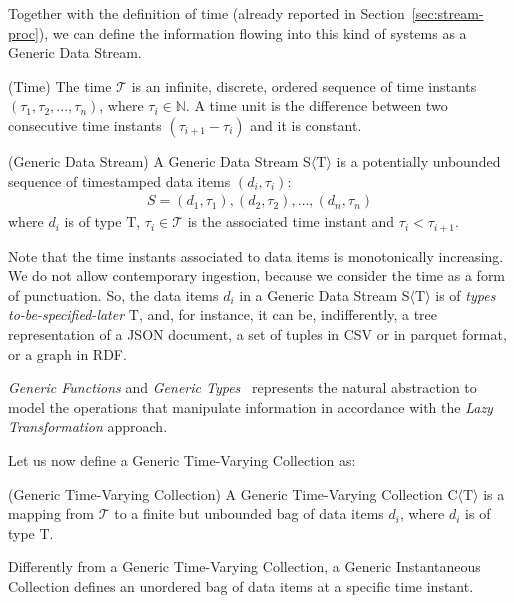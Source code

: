 Together with the definition of time (already reported in Section~\ref{sec:stream-proc}), we can define the information flowing into this kind of systems as a Generic Data Stream.

\begin{Definition}
(Time) The time $\mathcal{T}$ is an infinite, discrete, ordered sequence of time instants $(\tau_1,\tau_2,..., \tau_n)$, where $\tau_i \in \mathbb{N}$. A time unit is the difference between two consecutive time instants $(\tau_{i+1} - \tau_i)$ and it is constant.
\end{Definition}

\begin{Definition}
(Generic Data Stream) A Generic Data Stream S$\langle\mathrm{T}\rangle$ is a potentially unbounded sequence of timestamped data items $(d_i,\tau_i)$:
\noindent\begin{align*}
S = (d_1,\tau_1), (d_2,\tau_2), \ldots, (d_n,\tau_n)
\end{align*}  
where $d_i$ is of type $\mathrm{T}$, $\tau_i \in \mathcal{T}$ is the associated time instant and $\tau_i<\tau_{i+1}$.
\end{Definition}

Note that the time instants associated to data items is monotonically increasing. We do not allow contemporary ingestion, because we consider the time as a form of punctuation. 
So, the data items $d_i$ in a Generic Data Stream S$\langle\mathrm{T}\rangle$ is of \textit{types to-be-specified-later} $\mathrm{T}$, and, for instance, it can be, indifferently, a tree representation of a JSON document, a set of tuples in CSV or in parquet format, or a graph in RDF.

\textit{Generic Functions} and \textit{Generic Types}~\cite{DBLP:conf/dagstuhl/1998gp} represents the natural abstraction to model the operations that manipulate information in accordance with the \textit{Lazy Transformation} approach. 

Let us now define a Generic Time-Varying Collection as:

\begin{Definition}
(Generic Time-Varying Collection) A Generic Time-Varying Collection C$\langle\mathrm{T}\rangle$ is a mapping from $\mathcal{T}$ to a finite but unbounded bag of data items $d_i$, where $d_i$ is of type $\mathrm{T}$. 
\end{Definition}

Differently from a Generic Time-Varying Collection, a Generic Instantaneous Collection defines an unordered bag of data items at a specific time instant.

